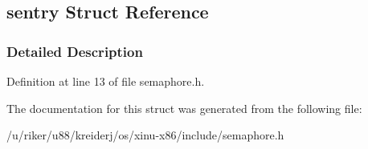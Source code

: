 \hypertarget{structsentry}{}\subsection{sentry Struct Reference}
\label{structsentry}


\subsubsection{Detailed Description}


Definition at line 13 of file semaphore.\+h.



The documentation for this struct was generated from the following file\+:\begin{DoxyCompactItemize}
\item 
/u/riker/u88/kreiderj/os/xinu-\/x86/include/semaphore.\+h\end{DoxyCompactItemize}
